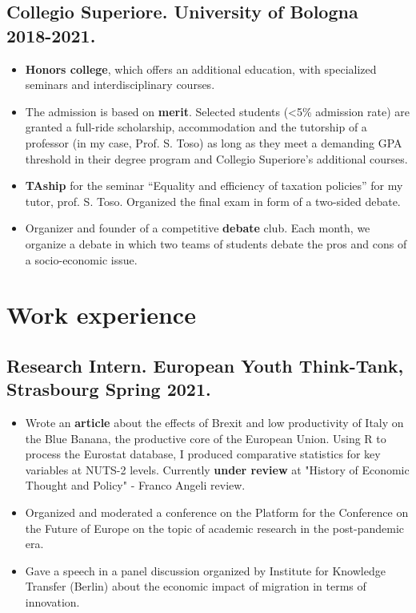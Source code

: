 \documentclass[10pt, a4paper]{extarticle}
\begin{document}
\subsection{\textbf{Collegio Superiore}. University of Bologna \textbar{} 2018-2021.}

\begin{itemize}
\item
  \textbf{Honors college}, which offers an additional education, with
  specialized seminars and interdisciplinary courses.
\item
  The admission is based on \textbf{merit}. Selected students
  (\textless5\% admission rate) are granted a full-ride scholarship,
  accommodation and the tutorship of a professor (in my case, Prof. S.
  Toso) as long as they meet a demanding GPA threshold in their degree
  program and Collegio Superiore's additional courses.
\item
  \textbf{TAship} for the seminar ``Equality and efficiency of taxation
  policies'' for my tutor, prof. S. Toso. Organized the final exam in
  form of a two-sided debate.
\item
  Organizer and founder of a competitive \textbf{debate} club. Each
  month, we organize a debate in which two teams of students debate the
  pros and cons of a socio-economic issue.
\end{itemize}

\hypertarget{work-experience}{%
\section{Work experience}\label{work-experience}}

\subsection{\textbf{Research Intern}. European Youth Think-Tank, Strasbourg
\textbar{} Spring 2021.}

\begin{itemize}
\item
  Wrote an \textbf{article} about the effects of Brexit and low
  productivity of Italy on the Blue Banana, the productive core of the
  European Union. Using R to process the Eurostat database, I produced
  comparative statistics for key variables at NUTS-2 levels. Currently
  \textbf{under review} at "History of Economic Thought and Policy" -
  Franco Angeli review.
\item
  Organized and moderated a conference on the Platform for the
  Conference on the Future of Europe on the topic of academic research
  in the post-pandemic era.
\item
  Gave a speech in a panel discussion organized by Institute for
  Knowledge Transfer (Berlin) about the economic impact of migration in
  terms of innovation.
\end{itemize}
\end{document}

